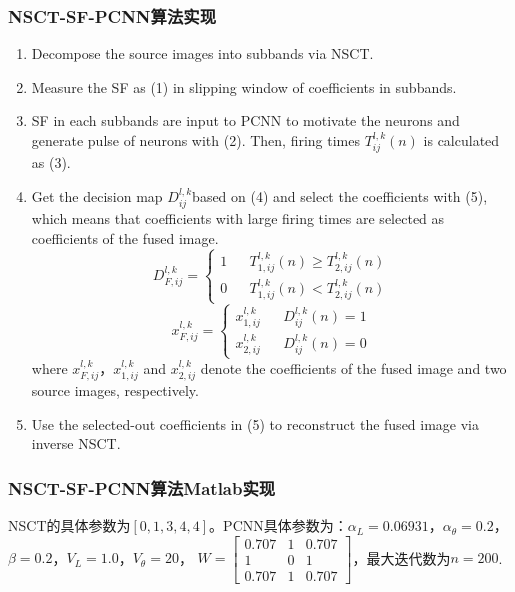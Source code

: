 \documentclass[10pt,aspectratio=43,mathserif]{beamer}
\begin{document}
        \begin{frame}
		  \frametitle{\textbf{NSCT-SF-PCNN算法实现}}
			\begin{enumerate}
  \item Decompose the source images into subbands via NSCT.
  \item Measure the SF as (1) in slipping window of coefficients in subbands.
  \item SF in each subbands are input to PCNN to motivate the neurons and generate pulse of neurons with (2). Then, firing times $T_{ij}^{l,k}(n)$ is calculated as (3).
  \item Get the decision map $D_{ij}^{l,k}$based on (4) and select the coefficients with (5), which means that coefficients with large firing times are selected as coefficients of the fused image.
    \begin{equation}
        D_{F,ij}^{l,k}=\left\{
        \begin{array}{rcl}
        1 & & {T_{1,ij}^{l,k}(n) \geq T_{2,ij}^{l,k}(n)}\\
        0 & & {T_{1,ij}^{l,k}(n) < T_{2,ij}^{l,k}(n)}
        \end{array} \right.
    \end{equation}
    \begin{equation}
        x_{F,ij}^{l,k}=\left\{
        \begin{array}{rcl}
        x_{1,ij}^{l,k} & & {D_{ij}^{l,k}(n)=1}\\
        x_{2,ij}^{l,k} & & {D_{ij}^{l,k}(n)=0}
        \end{array} \right.
    \end{equation}
    where $x_{F,ij}^{l,k}$，$x_{1,ij}^{l,k}$ and $x_{2,ij}^{l,k}$ denote the coefficients of the fused image and two source images, respectively.
  \item Use the selected-out coefficients in (5) to reconstruct the fused image via inverse NSCT.
\end{enumerate}
		\end{frame}

\begin{frame}
		  \frametitle{\textbf{NSCT-SF-PCNN算法Matlab实现}}
NSCT的具体参数为$\left[0,1,3,4,4\right]$。PCNN具体参数为：$\alpha_{L}=0.06931$，$\alpha_{\theta}=0.2$，$\beta=0.2$，$V_L=1.0$，$V_{\theta}=20$，
$W=\left[\begin{matrix}
   0.707 & 1 & 0.707 \\
   1 & 0 & 1 \\
   0.707 & 1 & 0.707
\end{matrix}\right]
$，最大迭代数为$n=200$.
		\end{frame}
\end{document}
